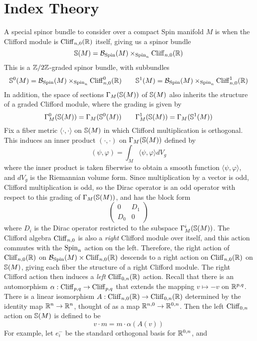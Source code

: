 %
\section{Index Theory}
%
A special spinor bundle to consider over a compact Spin manifold $M$ is when the Clifford
module is $\Cliff_{n,0}(\R)$ itself, giving us a spinor bundle
\[
\S(M) = \B_{\Spin}(M) \times_{\Spin_n} \Cliff_{n,0}(\R)
\]
This is a $\Z/2\Z$-graded spinor bundle, with subbundles
\[
\S^0(M) = \B_{\Spin}(M) \times_{\Spin_n} \Cliff_{n,0}^0(\R) \qquad
\S^1(M) = \B_{\Spin}(M) \times_{\Spin_n} \Cliff_{n,0}^1(\R)
\]
In addition, the space of sections $\Gamma_M(\S(M))$ of $\S(M)$ also inherits the
structure of a graded Clifford module, where the grading is given by
\[
\Gamma_M^0(\S(M)) = \Gamma_M(\S^0(M)) \qquad \Gamma_M^1(\S(M)) = \Gamma_M(\S^1(M))
\]
Fix a fiber metric $\langle\cdot,\cdot\rangle$ on $\S(M)$ in which Clifford
multiplication is orthogonal. This  induces an inner product $(\cdot,\cdot)$ on
$\Gamma_M(\S(M))$ defined by
\[
(\psi, \varphi) = \int_M \langle \psi, \varphi \rangle dV_g
\]
where the inner product is taken fiberwise to obtain a smooth function
$\langle \psi,\varphi\rangle$, and $dV_g$ is the Riemannian volume form.
Since multiplication by a vector is odd, Clifford multiplication is odd, so
the Dirac operator is an odd operator with respect to this grading of $\Gamma_M(\S(M))$,
and has the block form
\[
\begin{pmatrix}
0 & D_1 \\
D_0 & 0
\end{pmatrix}
\]
where $D_i$ is the Dirac operator restricted to the subspace $\Gamma_M^i(\S(M))$.
The Clifford algebra $\Cliff_{n,0}$ is also a \emph{right} Clifford module over
itself, and this action commutes with the $\Spin_n$ action on the left. Therefore,
the right action of $\Cliff_{n,0}(\R)$ on $\B_{\Spin}(M) \times \Cliff_{n,0}(\R)$
descends to a right action on $\Cliff_{n,0}(\R)$ on $\S(M)$, giving each fiber
the structure of a right Clifford module. The right Clifford action then induces
a \emph{left} $\Cliff_{0,n}(\R)$ action. Recall that there is an automorphism
$\alpha : \Cliff_{p,q} \to \Cliff_{p,q}$ that extends the mapping $v \mapsto -v$
on $\R^{p,q}$. There is a linear isomorphism $A : \Cliff_{n,0}(\R) \to \Cliff_{0,n}(\R)$
determined by the identity map $\R^n \to \R^n$, thought of as a map
$\R^{n,0} \to \R^{0,n}$. Then the left $\Cliff_{0,n}$ action on $\S(M)$ is defined
to be
\[
v \cdot m = m \cdot \alpha(A(v))
\]
For example, let $e_i^-$ be the standard orthogonal basis for $\R^{0,n}$, and

